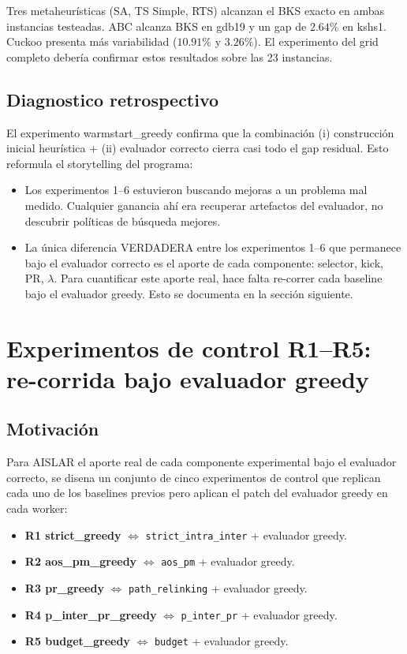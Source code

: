 Tres metaheurísticas (SA, TS Simple, RTS) alcanzan el BKS exacto en
ambas instancias testeadas. ABC alcanza BKS en gdb19 y un gap de
$2.64\%$ en kshs1. Cuckoo presenta más variabilidad
($10.91\%$ y $3.26\%$). El experimento del grid completo
debería confirmar estos resultados sobre las 23 instancias.

\subsection{Diagnostico retrospectivo}

El experimento warmstart\_greedy confirma que la combinación
(i) construcción inicial heurística + (ii) evaluador correcto cierra
casi todo el gap residual. Esto reformula el storytelling del programa:

\begin{itemize}
\item Los experimentos 1--6 estuvieron buscando mejoras a un
  problema mal medido. Cualquier ganancia ahí era recuperar
  artefactos del evaluador, no descubrir políticas de búsqueda mejores.
\item La única diferencia VERDADERA entre los experimentos 1--6 que
  permanece bajo el evaluador correcto es el aporte de cada
  componente: selector, kick, PR, $\lambda$. Para cuantificar este
  aporte real, hace falta re-correr cada baseline bajo el evaluador
  greedy. Esto se documenta en la sección siguiente.
\end{itemize}

\section{Experimentos de control R1--R5: re-corrida bajo evaluador greedy}
\label{sec:re-greedy}

\subsection{Motivación}

Para AISLAR el aporte real de cada componente experimental bajo el
evaluador correcto, se disena un conjunto de cinco experimentos de
control que replican cada uno de los baselines previos pero aplican el
patch del evaluador greedy en cada worker:

\begin{itemize}
\item \textbf{R1 strict\_greedy} $\Leftrightarrow$ \texttt{strict\_intra\_inter}
  + evaluador greedy.
\item \textbf{R2 aos\_pm\_greedy} $\Leftrightarrow$ \texttt{aos\_pm}
  + evaluador greedy.
\item \textbf{R3 pr\_greedy} $\Leftrightarrow$ \texttt{path\_relinking}
  + evaluador greedy.
\item \textbf{R4 p\_inter\_pr\_greedy} $\Leftrightarrow$ \texttt{p\_inter\_pr}
  + evaluador greedy.
\item \textbf{R5 budget\_greedy} $\Leftrightarrow$ \texttt{budget}
  + evaluador greedy.
\end{itemize}

